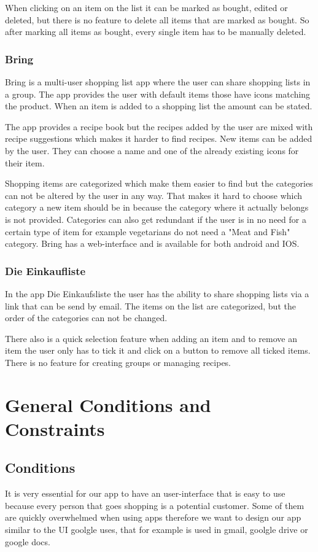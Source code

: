 \documentclass[12pt]{article}
\theoremstyle{definition}
\begin{document}
When clicking on an item on the list it can be marked as bought, edited or deleted, but there is no feature to delete all items that are marked as bought. So after marking all items as bought, every single item has to be manually deleted. 

\subsubsection{Bring}
Bring is a multi-user shopping list app where the user can share shopping lists in a group. The app provides the user with default items those have icons matching the product. When an item is added to a shopping list the amount can be stated. 

The app provides a recipe book but the recipes added by the user are mixed with recipe suggestions which makes it harder to find recipes. New items can be added by the user. They can choose a name and one of the already existing icons for their item.

Shopping items are categorized which make them easier to find but the categories can not be altered by the user in any way. That makes it hard to choose which category a new item should be in because the category where it actually belongs is not provided.
Categories can also get redundant if the user is in no need for a certain type of item for example vegetarians do not need a "Meat and Fish" category. Bring has a web-interface   and is available for both android and IOS.  

\subsubsection{Die Einkaufliste}
In the app Die Einkaufsliste the user has the ability to share shopping lists via a link that can be send by email. The items on the list are categorized, but the order of the categories can not be changed.

There also is a quick selection feature when adding an item and to remove an item the user only has to tick it and click on a button to remove all ticked items. There is no feature for creating groups or managing recipes.

\pagebreak

\section{General Conditions and Constraints}

\subsection{Conditions}
It is very essential for our app to have an user-interface that is easy to use because every person that goes shopping is a potential customer. Some of them are quickly overwhelmed when using apps therefore we want to design our app similar to the UI goolgle uses, that for example  is used in  gmail, goolgle drive or google docs.
\end{document}

